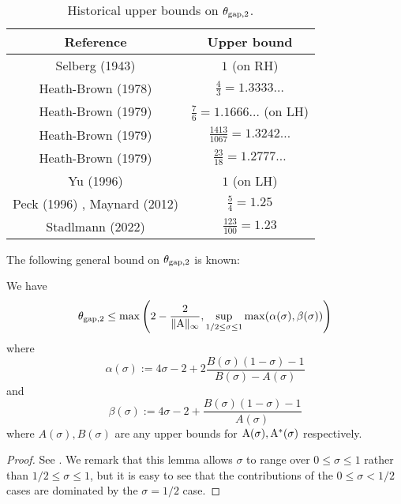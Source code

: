     \begin{table}[ht]
        \caption{Historical upper bounds on $\theta_{\mathrm{gap},2}$.}
        \centering
        \renewcommand{\arraystretch}{1.2}
        \begin{tabular}{|c|c|}
        \hline
        Reference & Upper bound \\
        \hline
        Selberg (1943) \cite{selberg_1943} & $1$ (on RH)\\
        \hline
        Heath-Brown (1978) \cite{heath_brown_consecutive_I} & $\frac{4}{3} = 1.3333\dots$\\
        \hline
        Heath-Brown (1979) \cite{heath_brown_consecutive_II} & $\frac{7}{6} = 1.1666\dots$ (on LH) \\
        \hline
        Heath-Brown (1979) \cite{heath_brown_consecutive_II} & $\frac{1413}{1067} = 1.3242\dots$ \\
        \hline
        Heath-Brown (1979) \cite{heath_brown_consecutive_III} & $\frac{23}{18} = 1.2777\dots$ \\
        \hline
        Yu (1996) \cite{yu_differences_1996} & $1$ (on LH) \\
        \hline
        Peck (1996) \cite{peck_on_1996}, Maynard (2012) \cite{maynard_difference_2012} & $\frac{5}{4} = 1.25$ \\
        \hline
        Stadlmann (2022) \cite{stadlmann_mean_2022} & $\frac{123}{100} = 1.23$ \\
        \hline
    \end{tabular}
    \end{table}\label{gapsquare-table}

The following general bound on $\theta_{\mathrm{gap},2}$ is known:

\begin{proposition}\label{gapsquare-from-a}
    We have
    $$ \theta_{\mathrm{gap},2} \leq \max\left( 2-\frac{2}{\|\mathrm{A}\|_\infty}, \sup_{1/2 \leq \sigma \leq 1} \max(\alpha(\sigma), \beta(\sigma))\right)$$
    where
    $$ \alpha(\sigma) := 4\sigma - 2 + 2 \frac{B(\sigma)(1-\sigma)-1}{B(\sigma)-A(\sigma)}$$
    and
    $$ \beta(\sigma) := 4\sigma - 2 + \frac{B(\sigma)(1-\sigma)-1}{A(\sigma)}$$
    where $A(\sigma), B(\sigma)$ are any upper bounds for $\mathrm{A}(\sigma), \mathrm{A}^*(\sigma)$ respectively.
\end{proposition}

\begin{proof} See \cite[Lemma 2]{heath_brown_consecutive_II}. We remark that this lemma allows $\sigma$ to range over $0 \leq \sigma \leq 1$ rather than $1/2 \leq \sigma \leq 1$, but it is easy to see that the contributions of the $0 \leq \sigma < 1/2$ cases are dominated by the $\sigma=1/2$ case.
\end{proof}

